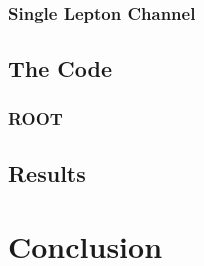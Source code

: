 \documentclass[11pt,a4paper]{article}
\begin{document}
\subsubsection{Single Lepton Channel}

\subsection{The Code}

\subsubsection{ROOT}

\subsection{Results}

\section{Conclusion}

\printbibliography
\end{document}

